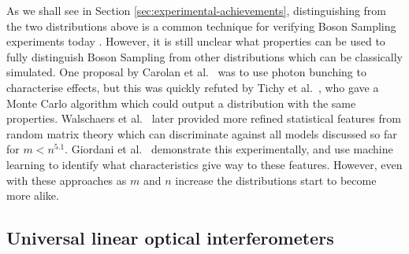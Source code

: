 As we shall see in Section \ref{sec:experimental-achievements}, distinguishing from the two distributions above is a common technique for verifying Boson Sampling experiments today \cite{carolan2015, zhong2018, paesani2018, wang2019}. However, it is still unclear what properties can be used to fully distinguish Boson Sampling from other distributions which can be classically simulated. One proposal by Carolan et al.~\cite{carolan2014} was to use photon bunching to characterise effects, but this was quickly refuted by Tichy et al.~\cite{tichy2014}, who gave a Monte Carlo algorithm which could output a distribution with the same properties. Walschaers et al.~\cite{walschaers2016, walschaers2016thesis} later provided more refined statistical features from random matrix theory which can discriminate against all models discussed so far for $m<n^{5.1}$. Giordani et al.~\cite{giordani2018} demonstrate this experimentally, and use machine learning to identify what characteristics give way to these features. However, even with these approaches as $m$ and $n$ increase the distributions start to become more alike.

\subsection{Universal linear optical interferometers}
\label{ssec:universal-lo}

